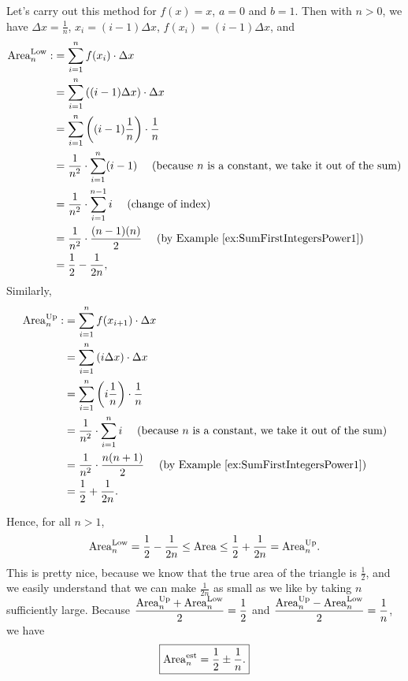 Let's carry out this method for $f(x)=x$, $a=0$ and $b=1$. Then with $n>0$, we have $\Delta x =\frac{1}{n}$, $x_i = (i-1) \Delta x$, $f(x_i)= (i-1) \Delta x$, and 
\begin{equation}
\begin{aligned}
    {\rm Area}^{\rm Low}_n :&=   \sum_{i=1}^n f(x_i)\cdot \Delta x \\
    &=   \sum_{i=1}^n \left((i-1) \Delta x\right) \cdot \Delta x  \\
    &=  \sum_{i=1}^n\left((i-1) \frac{1}{n}\right) \cdot \frac{1}{n} \\
    &= \frac{1}{n^2} \cdot  \sum_{i=1}^n (i-1) ~~~~(\text{because } n \text{ is a constant, we take it out of the sum}) \\
     &= \frac{1}{n^2} \cdot  \sum_{i=1}^{n-1} i ~~~~(\text{change of index}) \\
    &= \frac{1}{n^2} \cdot \frac{(n-1) (n)}{2} ~~~~(\text{by Example }\ref{ex:SumFirstIntegersPower1})\\
    &= \frac{1}{2} - \frac{1}{2n},
\end{aligned}
\end{equation}
Similarly, 
\begin{equation}
\begin{aligned}
    {\rm Area}^{\rm Up}_n :&=   \sum_{i=1}^{n} f(x_{i+1})\cdot \Delta x \\
    &=   \sum_{i=1}^n \left(i \Delta x\right) \cdot \Delta x  \\
    &=  \sum_{i=1}^n\left(i \frac{1}{n}\right) \cdot \frac{1}{n} \\
    &= \frac{1}{n^2} \cdot  \sum_{i=1}^n i ~~~~(\text{because } n \text{ is a constant, we take it out of the sum}) \\
    &= \frac{1}{n^2} \cdot \frac{n(n+1)}{2}  ~~~~(\text{by Example }\ref{ex:SumFirstIntegersPower1})\\
    &= \frac{1}{2} + \frac{1}{2n}.
\end{aligned}
\end{equation}

Hence, for all $n > 1$, 
\begin{equation}
    \label{eqn:AreaTriangleBounds}
    {\rm Area}^{\rm Low}_n =  \frac{1}{2} - \frac{1}{2n} \le {\rm Area} \le \frac{1}{2} + \frac{1}{2n} = {\rm Area}^{\rm Up}_n.
\end{equation}
This is pretty nice, because we know that the true area of the triangle is $\frac{1}{2}$, and we easily understand that we can make $\frac{1}{2n}$ as small as we like by taking $n$ sufficiently large. Because $\dfrac{{\rm Area}^{\rm Up}_n + {\rm Area}^{\rm Low}_n }{2} = \dfrac{1}{2}$ and $\dfrac{{\rm Area}^{\rm Up}_n - {\rm Area}^{\rm Low}_n }{2} = \dfrac{1}{n}$, we have
\begin{equation}
    \label{eqn:AreaTriangleApprox}
   \boxed{ {\rm Area}^{\rm est}_n = \frac{1}{2} \pm \frac{1}{n}.}
\end{equation}
 



